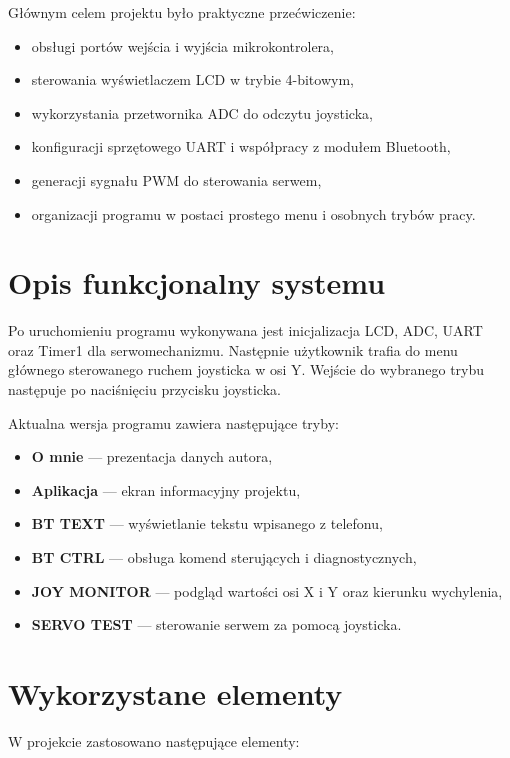 \documentclass[a4paper,12pt]{article}
\begin{document}
Głównym celem projektu było praktyczne przećwiczenie:

\begin{itemize}[leftmargin=1.2cm]
    \item obsługi portów wejścia i wyjścia mikrokontrolera,
    \item sterowania wyświetlaczem LCD w trybie 4-bitowym,
    \item wykorzystania przetwornika ADC do odczytu joysticka,
    \item konfiguracji sprzętowego UART i współpracy z modułem Bluetooth,
    \item generacji sygnału PWM do sterowania serwem,
    \item organizacji programu w postaci prostego menu i osobnych trybów pracy.
\end{itemize}

\section{Opis funkcjonalny systemu}

Po uruchomieniu programu wykonywana jest inicjalizacja LCD, ADC, UART oraz Timer1 dla serwomechanizmu. Następnie użytkownik trafia do menu głównego sterowanego ruchem joysticka w osi Y. Wejście do wybranego trybu następuje po naciśnięciu przycisku joysticka.

Aktualna wersja programu zawiera następujące tryby:

\begin{itemize}[leftmargin=1.2cm]
    \item \textbf{O mnie} --- prezentacja danych autora,
    \item \textbf{Aplikacja} --- ekran informacyjny projektu,
    \item \textbf{BT TEXT} --- wyświetlanie tekstu wpisanego z telefonu,
    \item \textbf{BT CTRL} --- obsługa komend sterujących i diagnostycznych,
    \item \textbf{JOY MONITOR} --- podgląd wartości osi X i Y oraz kierunku wychylenia,
    \item \textbf{SERVO TEST} --- sterowanie serwem za pomocą joysticka.
\end{itemize}

\section{Wykorzystane elementy}

W projekcie zastosowano następujące elementy:
\end{document}
